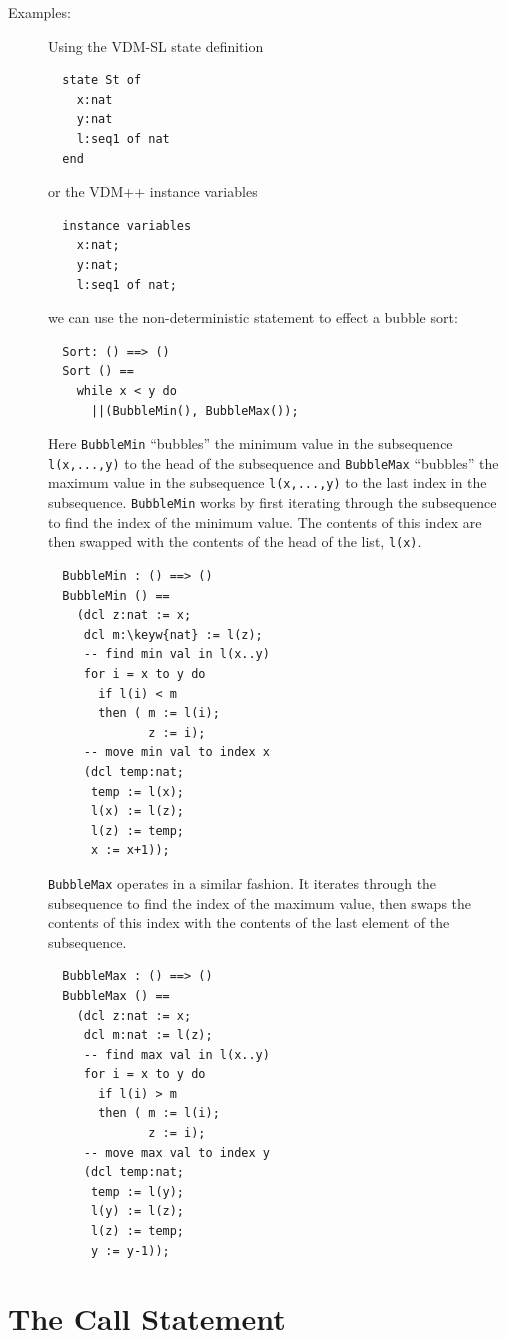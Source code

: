 \documentclass{overturerepchap}
\newcommand{\keyw}[1]{{\bf\ttfamily #1}}
\begin{document}
\begin{description}
\item[Examples:] Using the VDM-SL
state definition
  \begin{lstlisting}
  state St of
    x:nat
    y:nat
    l:seq1 of nat
  end
  \end{lstlisting}
or the VDM++ instance variables
  \begin{lstlisting}
  instance variables
    x:nat;
    y:nat;
    l:seq1 of nat;
  \end{lstlisting}
  we can use the non-deterministic statement to effect a bubble sort:
  \begin{lstlisting}
  Sort: () ==> ()
  Sort () ==
    while x < y do
      ||(BubbleMin(), BubbleMax());
  \end{lstlisting}
\label{sortDef}
  Here \texttt{BubbleMin} ``bubbles'' the minimum value in the
  subsequence \texttt{l(x,...,y)} to the head of the subsequence and
  \texttt{BubbleMax} ``bubbles'' the maximum value in the subsequence
  \texttt{l(x,...,y)} to the last index in the
  subsequence. \texttt{BubbleMin} works by first iterating through the
  subsequence to find the index of the minimum value. The contents of
  this index are then swapped with the contents of the head of the
  list, \texttt{l(x)}.
  \begin{lstlisting}
  BubbleMin : () ==> ()
  BubbleMin () ==
    (dcl z:nat := x;
     dcl m:\keyw{nat} := l(z);
     -- find min val in l(x..y)
     for i = x to y do
       if l(i) < m
       then ( m := l(i);
              z := i);
     -- move min val to index x
     (dcl temp:nat;
      temp := l(x);
      l(x) := l(z);
      l(z) := temp;
      x := x+1));
\end{lstlisting}
\texttt{BubbleMax} operates in a similar fashion. It iterates through the
  subsequence to find the index of the maximum value, then swaps the
  contents of this index with the contents of the last element of the
  subsequence. 
\begin{lstlisting}
  BubbleMax : () ==> ()
  BubbleMax () ==
    (dcl z:nat := x;
     dcl m:nat := l(z);
     -- find max val in l(x..y)
     for i = x to y do
       if l(i) > m
       then ( m := l(i);
              z := i);
     -- move max val to index y
     (dcl temp:nat;
      temp := l(y);
      l(y) := l(z);
      l(z) := temp;
      y := y-1));
  \end{lstlisting}
\end{description}

\section{The Call Statement}
\label{call-stmt}
\end{document}

